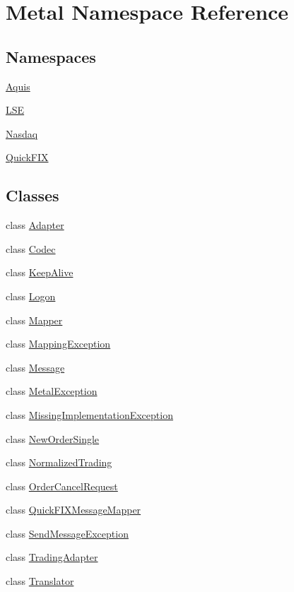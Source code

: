 \hypertarget{namespaceMetal}{}\section{Metal Namespace Reference}
\label{namespaceMetal}
\subsection*{Namespaces}
\begin{DoxyCompactItemize}
\item 
 \hyperlink{namespaceMetal_1_1Aquis}{Aquis}
\item 
 \hyperlink{namespaceMetal_1_1LSE}{L\+S\+E}
\item 
 \hyperlink{namespaceMetal_1_1Nasdaq}{Nasdaq}
\item 
 \hyperlink{namespaceMetal_1_1QuickFIX}{Quick\+F\+I\+X}
\end{DoxyCompactItemize}
\subsection*{Classes}
\begin{DoxyCompactItemize}
\item 
class \hyperlink{classMetal_1_1Adapter}{Adapter}
\item 
class \hyperlink{classMetal_1_1Codec}{Codec}
\item 
class \hyperlink{classMetal_1_1KeepAlive}{Keep\+Alive}
\item 
class \hyperlink{classMetal_1_1Logon}{Logon}
\item 
class \hyperlink{classMetal_1_1Mapper}{Mapper}
\item 
class \hyperlink{classMetal_1_1MappingException}{Mapping\+Exception}
\item 
class \hyperlink{classMetal_1_1Message}{Message}
\item 
class \hyperlink{classMetal_1_1MetalException}{Metal\+Exception}
\item 
class \hyperlink{classMetal_1_1MissingImplementationException}{Missing\+Implementation\+Exception}
\item 
class \hyperlink{classMetal_1_1NewOrderSingle}{New\+Order\+Single}
\item 
class \hyperlink{classMetal_1_1NormalizedTrading}{Normalized\+Trading}
\item 
class \hyperlink{classMetal_1_1OrderCancelRequest}{Order\+Cancel\+Request}
\item 
class \hyperlink{classMetal_1_1QuickFIXMessageMapper}{Quick\+F\+I\+X\+Message\+Mapper}
\item 
class \hyperlink{classMetal_1_1SendMessageException}{Send\+Message\+Exception}
\item 
class \hyperlink{classMetal_1_1TradingAdapter}{Trading\+Adapter}
\item 
class \hyperlink{classMetal_1_1Translator}{Translator}
\end{DoxyCompactItemize}
